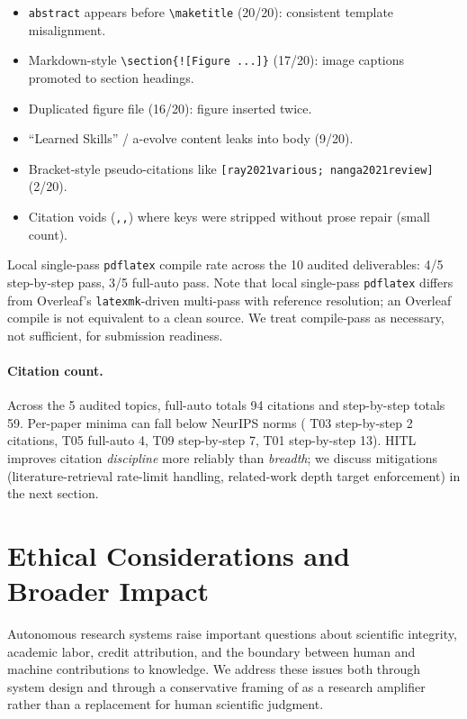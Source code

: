 \begin{itemize}[nosep,leftmargin=*]
\item \texttt{abstract} appears before \texttt{\textbackslash maketitle} (20/20):
  consistent template misalignment.
\item Markdown-style \texttt{\textbackslash section\{![Figure ...]\}} (17/20):
  image captions promoted to section headings.
\item Duplicated figure file (16/20): figure inserted twice.
\item ``Learned Skills'' / a-evolve content leaks into body (9/20).
\item Bracket-style pseudo-citations like \texttt{[ray2021various; nanga2021review]}
  (2/20).
\item Citation voids (\texttt{,,}) where keys were stripped without prose repair
  (small count).
\end{itemize}

Local single-pass \texttt{pdflatex} compile rate across the 10 audited
deliverables: 4/5 step-by-step pass, 3/5 full-auto pass. Note that local
single-pass \texttt{pdflatex} differs from Overleaf's \texttt{latexmk}-driven
multi-pass with reference resolution; an Overleaf compile is not equivalent to a
clean source. We treat compile-pass as necessary, not sufficient, for submission
readiness.

\paragraph{Citation count.}
Across the 5 audited topics, full-auto totals 94 citations and step-by-step totals
59. Per-paper minima can fall below NeurIPS norms (\eg{} T03 step-by-step 2
citations, T05 full-auto 4, T09 step-by-step 7, T01 step-by-step 13). HITL
improves citation \emph{discipline} more reliably than \emph{breadth}; we discuss
mitigations (literature-retrieval rate-limit handling, related-work depth target
enforcement) in the next section.

\section{Ethical Considerations and Broader Impact}
\label{sec:ethics}

Autonomous research systems raise important questions about scientific integrity, academic labor, credit attribution, and the boundary between human and machine contributions to knowledge. We address these issues both through system design and through a conservative framing of \system{} as a research amplifier rather than a replacement for human scientific judgment.

